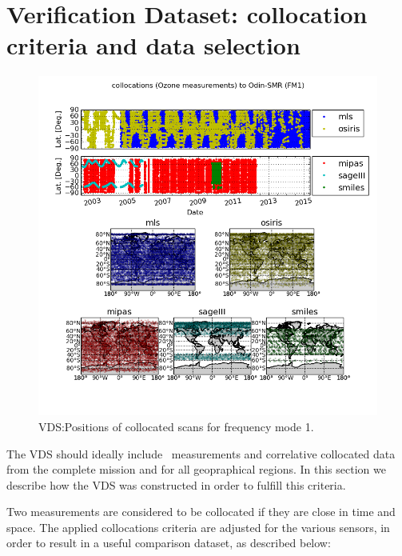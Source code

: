 \section{Verification Dataset: collocation criteria and data selection}
\label{sec:vdsselection}

\begin{figure}[t]
\centering
\includegraphics[width=17cm]{test_collocation_fm1.png}
\caption{VDS:Positions of collocated scans for frequency mode 1.}
\label{fig:vdsfm1}
\end{figure}


The VDS should ideally include \smr\ measurements and correlative collocated 
data from the complete mission and for all geopraphical regions.
In this section we describe how the VDS was constructed
in order to fulfill this criteria.

Two measurements are considered to be collocated if they
are close in time and space. The applied collocations
criteria are adjusted for the various sensors, in order
to result in a useful comparison dataset, as described below:

